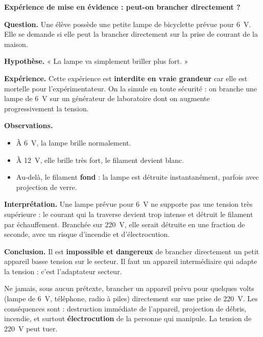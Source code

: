 \documentclass[11pt]{article}
\newcommand{\cle}[1]{{\popxbold\color{popdark}#1}}
\begin{document}
\textbf{Expérience de mise en évidence : peut-on brancher directement ?}

\begin{experience}
\textbf{Question.} Une élève possède une petite lampe de bicyclette prévue pour \SI{6}{V}. Elle se demande si elle peut la brancher directement sur la prise de courant de la maison.

\textbf{Hypothèse.} « La lampe va simplement briller plus fort. »

\textbf{Expérience.} Cette expérience est \textbf{interdite en vraie grandeur} car elle est mortelle pour l'expérimentateur. On la simule en toute sécurité : on branche une lampe de \SI{6}{V} sur un générateur de laboratoire dont on augmente progressivement la tension.

\textbf{Observations.}
\begin{itemize}
\item À \SI{6}{V}, la lampe brille normalement.
\item À \SI{12}{V}, elle brille très fort, le filament devient blanc.
\item Au-delà, le filament \textbf{fond} : la lampe est détruite instantanément, parfois avec projection de verre.
\end{itemize}

\textbf{Interprétation.} Une lampe prévue pour \SI{6}{V} ne supporte pas une tension très supérieure : le courant qui la traverse devient trop intense et détruit le filament par échauffement. Branchée sur \SI{220}{V}, elle serait détruite en une fraction de seconde, avec un risque d'incendie et d'électrocution.

\textbf{Conclusion.} Il est \textbf{impossible et dangereux} de brancher directement un petit appareil basse tension sur le secteur. Il faut un \cle{appareil intermédiaire} qui adapte la tension : c'est l'\cle{adaptateur secteur}.
\end{experience}

\begin{attention}
Ne jamais, sous aucun prétexte, brancher un appareil prévu pour quelques volts (lampe de \SI{6}{V}, téléphone, radio à piles) directement sur une prise de \SI{220}{V}. Les conséquences sont : destruction immédiate de l'appareil, projection de débris, incendie, et surtout \textbf{électrocution} de la personne qui manipule. La tension de \SI{220}{V} peut tuer.
\end{attention}
\end{document}
